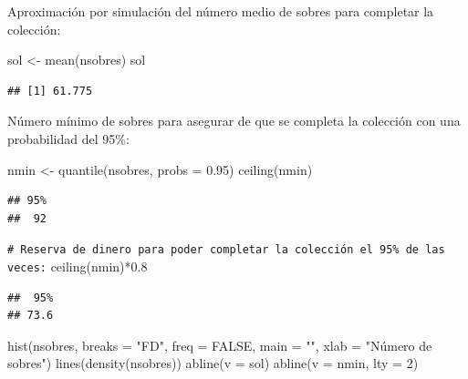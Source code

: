 \documentclass[
]{book}
\newenvironment{Shaded}{\begin{snugshade}}{\end{snugshade}}
\newcommand{\AttributeTok}[1]{\textcolor[rgb]{0.77,0.63,0.00}{#1}}
\newcommand{\CommentTok}[1]{\textcolor[rgb]{0.56,0.35,0.01}{\textit{#1}}}
\newcommand{\ConstantTok}[1]{\textcolor[rgb]{0.00,0.00,0.00}{#1}}
\newcommand{\DecValTok}[1]{\textcolor[rgb]{0.00,0.00,0.81}{#1}}
\newcommand{\FloatTok}[1]{\textcolor[rgb]{0.00,0.00,0.81}{#1}}
\newcommand{\FunctionTok}[1]{\textcolor[rgb]{0.00,0.00,0.00}{#1}}
\newcommand{\NormalTok}[1]{#1}
\newcommand{\OtherTok}[1]{\textcolor[rgb]{0.56,0.35,0.01}{#1}}
\newcommand{\SpecialCharTok}[1]{\textcolor[rgb]{0.00,0.00,0.00}{#1}}
\newcommand{\StringTok}[1]{\textcolor[rgb]{0.31,0.60,0.02}{#1}}
\theoremstyle{break}
\theoremstyle{nonumberplain}
\renewcommand{\CommentTok}[1]{\textcolor[rgb]{0.41,0.41,0.41}{\texttt{#1}}}
\begin{document}
Aproximación por simulación del número medio de sobres para completar la colección:

\begin{Shaded}
\begin{Highlighting}[]
\NormalTok{sol }\OtherTok{\textless{}{-}} \FunctionTok{mean}\NormalTok{(nsobres)}
\NormalTok{sol}
\end{Highlighting}
\end{Shaded}

\begin{verbatim}
## [1] 61.775
\end{verbatim}

Número mínimo de sobres para asegurar de que se completa la colección con una probabilidad del 95\%:

\begin{Shaded}
\begin{Highlighting}[]
\NormalTok{nmin }\OtherTok{\textless{}{-}} \FunctionTok{quantile}\NormalTok{(nsobres, }\AttributeTok{probs =} \FloatTok{0.95}\NormalTok{)}
\FunctionTok{ceiling}\NormalTok{(nmin)}
\end{Highlighting}
\end{Shaded}

\begin{verbatim}
## 95% 
##  92
\end{verbatim}

\begin{Shaded}
\begin{Highlighting}[]
\CommentTok{\# Reserva de dinero para poder completar la colección el 95\% de las veces:}
\FunctionTok{ceiling}\NormalTok{(nmin)}\SpecialCharTok{*}\FloatTok{0.8}
\end{Highlighting}
\end{Shaded}

\begin{verbatim}
##  95% 
## 73.6
\end{verbatim}

\begin{Shaded}
\begin{Highlighting}[]
\FunctionTok{hist}\NormalTok{(nsobres, }\AttributeTok{breaks =} \StringTok{"FD"}\NormalTok{, }\AttributeTok{freq =} \ConstantTok{FALSE}\NormalTok{,}
     \AttributeTok{main =} \StringTok{""}\NormalTok{, }\AttributeTok{xlab =} \StringTok{"Número de sobres"}\NormalTok{)}
\FunctionTok{lines}\NormalTok{(}\FunctionTok{density}\NormalTok{(nsobres))}
\FunctionTok{abline}\NormalTok{(}\AttributeTok{v =}\NormalTok{ sol)}
\FunctionTok{abline}\NormalTok{(}\AttributeTok{v =}\NormalTok{ nmin, }\AttributeTok{lty =} \DecValTok{2}\NormalTok{)}
\end{Highlighting}
\end{Shaded}
\end{document}

